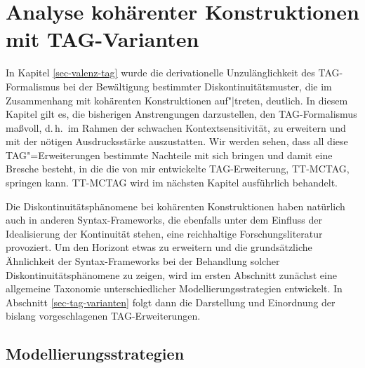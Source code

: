 
\chapter{Analyse kohärenter Konstruktionen mit TAG-Varianten} \label{sec-kohaerenz-tag}

In Kapitel \ref{sec-valenz-tag} wurde die derivationelle Unzulänglichkeit des TAG-Formalismus bei der Bewältigung bestimmter Diskontinuitätsmuster, die im Zusammenhang mit kohärenten Konstruktionen auf"|treten, deutlich. In diesem Kapitel gilt es, die bisherigen Anstrengungen darzustellen, den TAG-Formalismus ma\ss voll, d.\,h.\ im Rahmen der schwachen Kontextsensitivität, zu erweitern und mit der nötigen Ausdrucksstärke auszustatten. Wir werden sehen, dass all diese TAG"=Erweiterungen bestimmte Nachteile mit sich bringen und damit eine Bresche besteht, in die die von mir entwickelte TAG-Erweiterung, TT-MCTAG, springen kann. TT-MCTAG wird im nächsten Kapitel ausführlich behandelt. 

Die Diskontinuitätsphänomene bei kohärenten Konstruktionen haben natürlich auch in anderen Syntax-Frameworks, die ebenfalls unter dem Einfluss der Idealisierung der Kontinuität stehen, eine reichhaltige Forschungsliteratur provoziert. Um den Horizont etwas zu erweitern und die grundsätzliche Ähnlichkeit der Syntax-Frameworks bei der Behandlung solcher Diskontinuitätsphänomene zu zeigen, wird im ersten Abschnitt zunächst eine allgemeine Taxonomie unterschiedlicher Modellierungsstrategien entwickelt. In Abschnitt \ref{sec-tag-varianten} folgt dann die Darstellung und Einordnung der bislang vorgeschlagenen TAG-Erweiterungen.  

\section{Modellierungsstrategien} \label{sec-ttmctag-modellierungsstrategien}

